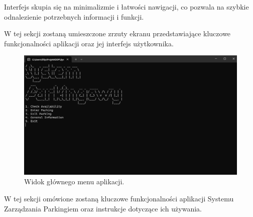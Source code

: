 \documentclass{article}
\begin{document}
Interfejs skupia się na minimalizmie i łatwości nawigacji, co pozwala na szybkie odnalezienie potrzebnych informacji i funkcji.

W tej sekcji zostaną umieszczone zrzuty ekranu przedstawiające kluczowe funkcjonalności aplikacji oraz jej interfejs użytkownika.

\begin{figure}[H]
\centering
\includegraphics[width=\textwidth]{photos/mainmenu.png}
\caption{Widok głównego menu aplikacji.}
\end{figure}

W tej sekcji omówione zostaną kluczowe funkcjonalności aplikacji Systemu Zarządzania Parkingiem oraz instrukcje dotyczące ich używania.
\end{document}
